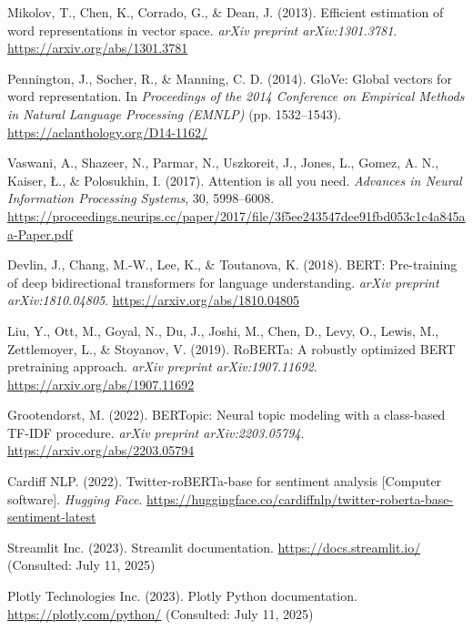 \documentclass[12pt,a4paper,twoside,openany]{book}
\begin{document}
\begin{thebibliography}{99}

Mikolov, T., Chen, K., Corrado, G., \& Dean, J. (2013). Efficient estimation of word representations in vector space. \textit{arXiv preprint arXiv:1301.3781}. \url{https://arxiv.org/abs/1301.3781}

Pennington, J., Socher, R., \& Manning, C. D. (2014). GloVe: Global vectors for word representation. In \textit{Proceedings of the 2014 Conference on Empirical Methods in Natural Language Processing (EMNLP)} (pp. 1532–1543). \url{https://aclanthology.org/D14-1162/}

Vaswani, A., Shazeer, N., Parmar, N., Uszkoreit, J., Jones, L., Gomez, A. N., Kaiser, Ł., \& Polosukhin, I. (2017). Attention is all you need. \textit{Advances in Neural Information Processing Systems}, 30, 5998–6008. \url{https://proceedings.neurips.cc/paper/2017/file/3f5ee243547dee91fbd053c1c4a845aa-Paper.pdf}

Devlin, J., Chang, M.-W., Lee, K., \& Toutanova, K. (2018). BERT: Pre-training of deep bidirectional transformers for language understanding. \textit{arXiv preprint arXiv:1810.04805}. \url{https://arxiv.org/abs/1810.04805}

Liu, Y., Ott, M., Goyal, N., Du, J., Joshi, M., Chen, D., Levy, O., Lewis, M., Zettlemoyer, L., \& Stoyanov, V. (2019). RoBERTa: A robustly optimized BERT pretraining approach. \textit{arXiv preprint arXiv:1907.11692}. \url{https://arxiv.org/abs/1907.11692}

Grootendorst, M. (2022). BERTopic: Neural topic modeling with a class-based TF-IDF procedure. \textit{arXiv preprint arXiv:2203.05794}. \url{https://arxiv.org/abs/2203.05794}

Cardiff NLP. (2022). Twitter-roBERTa-base for sentiment analysis [Computer software]. \textit{Hugging Face}. \url{https://huggingface.co/cardiffnlp/twitter-roberta-base-sentiment-latest}

Streamlit Inc. (2023). Streamlit documentation. \url{https://docs.streamlit.io/} (Consulted: July 11, 2025)

Plotly Technologies Inc. (2023). Plotly Python documentation. \url{https://plotly.com/python/} (Consulted: July 11, 2025)

\end{thebibliography}
\end{document}
